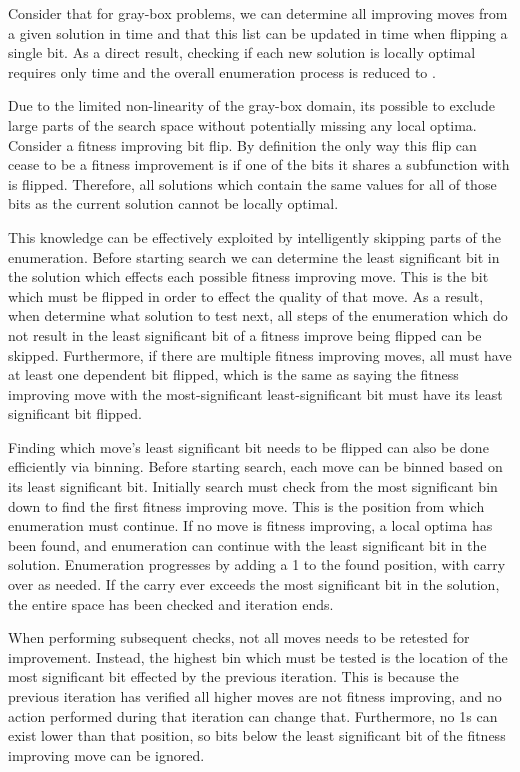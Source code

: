Consider that for gray-box problems, we can determine all improving moves from a given
solution in  time and that this list can be updated in  time when flipping
a single bit. As a direct result, checking if each new solution is locally optimal requires
only  time and the overall enumeration process is reduced to .

Due to the limited non-linearity of the gray-box domain, its possible to exclude large
parts of the search space without potentially missing any local optima. Consider a fitness
improving bit flip. By definition the only way this flip can cease to be a fitness improvement
is if one of the bits it shares a subfunction with is flipped. Therefore, all solutions which
contain the same values for all of those bits as the current solution cannot be locally optimal.

This knowledge can be effectively exploited by intelligently skipping parts of the enumeration.
Before starting search we can determine the least significant bit in the solution which effects
each possible fitness improving move. This is the bit which must be flipped in order to effect
the quality of that move. As a result, when determine what solution to test next, all steps
of the enumeration which do not result in the least significant bit of a fitness improve being
flipped can be skipped. Furthermore, if there are multiple fitness improving moves, all must
have at least one dependent bit flipped, which is the same as saying the fitness improving move
with the most-significant least-significant bit must have its least significant bit flipped.


Finding which move's least significant bit needs to be flipped can also be done efficiently via binning.
Before starting search, each move can be binned based on its least significant bit. Initially
search must check from the most significant bin down to find the first fitness improving move.
This is the position from which enumeration must continue. If no move is fitness improving, a local
optima has been found, and enumeration can continue with the least significant bit in the solution.
Enumeration progresses by adding a 1 to the found position, with carry over as needed.
If the carry ever exceeds the most significant bit in the solution, the entire space has been checked and iteration ends.

When performing subsequent checks, not all moves needs to be retested for improvement. Instead, the highest
bin which must be tested is the location of the most significant bit effected by the previous iteration. This is because
the previous iteration has verified all higher moves are not fitness improving, and no action performed during
that iteration can change that. Furthermore, no 1s can exist lower than that position, so bits
below the least significant bit of the fitness improving move can be ignored.

